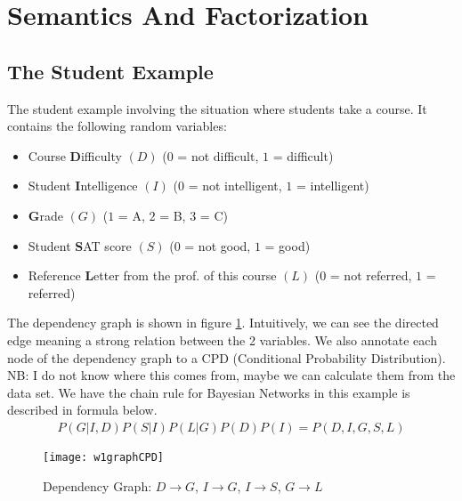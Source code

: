 \section{Semantics And Factorization}
\subsection{The Student Example}
The student example involving the situation where students take a course. It contains the following random variables:
\begin{itemize}
	\item Course \textbf{D}ifficulty $(D)$ ($0$ = not difficult, $1$ = difficult)
	\item Student \textbf{I}ntelligence $(I)$ ($0$ = not intelligent, $1$ = intelligent)
	\item \textbf{G}rade $(G)$ ($1$ = A, $2$ = B, $3$ = C)
	\item Student \textbf{S}AT score $(S)$ ($0$ = not good, $1$ = good)
	\item Reference \textbf{L}etter from the prof. of this course $(L)$ ($0$ = not referred, $1$ = referred)
\end{itemize}

The dependency graph is shown in figure \ref{w1graphCPD}. Intuitively, we can see the directed edge meaning a strong relation between the 2 variables. We also annotate each node of the dependency graph to a CPD (Conditional Probability Distribution). NB: I do not know where this comes from, maybe we can calculate them from the data set. We have the chain rule for Bayesian Networks in this example is described in formula below.
\begin{align}
P(G|I,D)P(S|I)P(L|G)P(D)P(I) = P(D,I,G,S,L)
\end{align}

\begin{figure}[!ht]
\centering
\texttt{[image: w1graphCPD]}
\caption[Dependency Graph]{Dependency Graph: $D \rightarrow G$, $I \rightarrow G$, $I \rightarrow S$, $G \rightarrow L$}
\label{w1graphCPD}
\end{figure}


